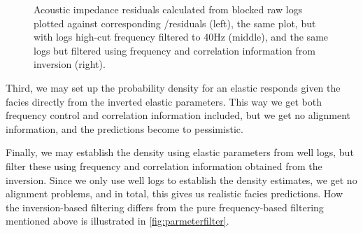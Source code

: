 \begin{figure}
  \centering
  \caption{Acoustic impedance residuals calculated from blocked raw
    logs plotted against corresponding \vp/\vs  residuals (left), the
    same plot, but with logs high-cut frequency  filtered to 40Hz
    (middle), and the same logs but filtered using frequency and
    correlation information from inversion (right).} 
  \label{fig:parmeterfilter}
\end{figure} 

Third, we may set up the probability density for an elastic responds
given the facies directly from the inverted elastic parameters. This
way we get both frequency control and correlation information
included, but we get no alignment information, and the predictions
become to pessimistic.

Finally, we may establish the density using elastic parameters from
well logs, but filter these using frequency and correlation
information obtained from the inversion. Since we only use well logs
to establish the density estimates, we get no alignment problems, and
in total, this gives us realistic facies predictions. How the
inversion-based filtering differs from the pure frequency-based
filtering mentioned above is illustrated in
\autoref{fig:parmeterfilter}.  

